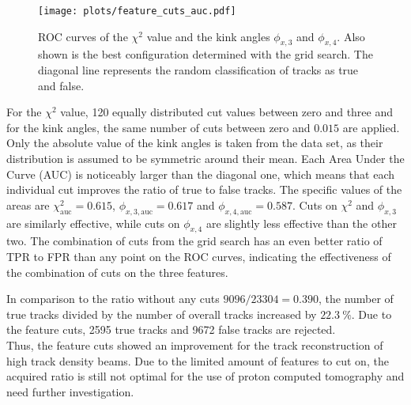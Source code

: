 \begin{figure}[H]
  \centering
  \texttt{[image: plots/feature\_cuts\_auc.pdf]}
  \caption{ROC curves of the $\chi^2$ value and the kink angles $\phi_{x,3}$ and $\phi_{x,4}$. Also shown is the best configuration determined with the grid search. The diagonal
  line represents the random classification of tracks as true and false.}
  \label{fig:feature_grid}
\end{figure}

For the $\chi^2$ value, 120 equally distributed cut values between zero and three and for the kink angles, the same number of cuts between
zero and $0.015$ are applied. Only the absolute value of the
kink angles is taken from the data set, as their distribution is assumed to be symmetric around their mean. Each Area Under the Curve (AUC) is noticeably larger than the diagonal
one, which means that each individual cut improves the ratio of true to false tracks. The specific values of the areas are $\chi^2_{\text{auc}} = 0.615$,
$\phi_{x,3,\text{auc}} = 0.617$ and $\phi_{x,4,\text{auc}} = 0.587$. Cuts on $\chi^2$ and $\phi_{x,3}$ are similarly effective, while cuts on $\phi_{x,4}$ are slightly
less effective than the other two. The combination of cuts from the grid search has an even better ratio of TPR to FPR than any point on the ROC curves, indicating the
effectiveness of the combination of cuts on the three features.

In comparison to the ratio without any cuts $9096/23304 = 0.390$, the number of true tracks divided by the number of overall tracks increased by $\SI{22.3}{\percent}$. Due to
the feature cuts, 2595 true tracks and 9672 false tracks are rejected. \\
Thus, the feature cuts showed an improvement for the track reconstruction of high track density beams. Due to the limited amount of features to cut on, the acquired ratio
is still not optimal for the use of proton computed tomography and need further investigation.
